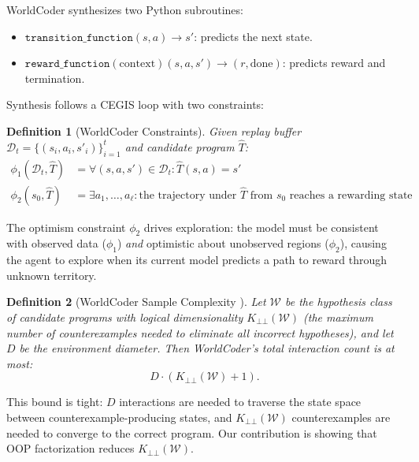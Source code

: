 \documentclass{article}
\newtheorem{definition}{Definition}
\newcommand{\calD}{\mathcal{D}}
\newcommand{\calW}{\mathcal{W}}
\begin{document}
WorldCoder synthesizes two Python subroutines:
\begin{itemize}[nosep]
    \item $\texttt{transition\_function}(s, a) \to s'$: predicts the next state.
    \item $\texttt{reward\_function}(\text{context})(s, a, s') \to (r, \text{done})$:
          predicts reward and termination.
\end{itemize}
Synthesis follows a CEGIS loop with two constraints:

\begin{definition}[WorldCoder Constraints]
\label{def:wc_constraints}
Given replay buffer $\calD_t = \{(s_i, a_i, s'_i)\}_{i=1}^t$ and candidate
program $\hat{T}$:
\begin{align}
    \phi_1(\calD_t, \hat{T}) &= \forall (s, a, s') \in \calD_t :
        \hat{T}(s, a) = s'
        \tag{data consistency} \\
    \phi_2(s_0, \hat{T}) &= \exists a_1, \ldots, a_\ell :
        \text{the trajectory under } \hat{T} \text{ from } s_0
        \text{ reaches a rewarding state}
        \tag{optimism}
\end{align}
\end{definition}

The optimism constraint $\phi_2$ drives exploration: the model must be
consistent with observed data ($\phi_1$) \emph{and} optimistic about
unobserved regions ($\phi_2$), causing the agent to explore when its current
model predicts a path to reward through unknown territory.

\begin{definition}[WorldCoder Sample Complexity {\cite[Theorem~2.4]{tang2024worldcoder}}]
\label{def:wc_bound}
Let $\calW$ be the hypothesis class of candidate programs with logical
dimensionality $K_{\bot\!\!\bot}(\calW)$ (the maximum number of counterexamples
needed to eliminate all incorrect hypotheses), and let $D$ be the environment
diameter.  Then WorldCoder's total interaction count is at most:
\begin{equation}
    D \cdot (K_{\bot\!\!\bot}(\calW) + 1).
\end{equation}
\end{definition}

This bound is tight: $D$ interactions are needed to traverse the state space
between counterexample-producing states, and $K_{\bot\!\!\bot}(\calW)$
counterexamples are needed to converge to the correct program.  Our
contribution is showing that OOP factorization reduces
$K_{\bot\!\!\bot}(\calW)$.
\end{document}
